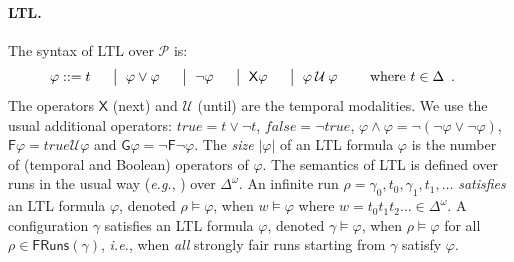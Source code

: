 \documentclass[10pt,a4paper]{article}
\newcommand{\size}[1]{|#1|}
\newcommand{\prot}{\mathcal{P}}
\newcommand{\fairrunsfrom}[1]{\mathsf{FRuns}(#1)}
\newcommand{\config}{\gamma}
\newcommand{\run}{\rho}
\newcommand{\transitions}{\Delta}
\newcommand*{\atrans}{t}
\newcommand{\DefOR}{\ensuremath{\hspace{0.6em}\big|\hspace{0.6em}}}
\newcommand{\ltlnext}{\mathsf{X}}
\newcommand{\ltlglobally}{\mathsf{G}}
\newcommand{\ltlfinally}{\mathsf{F}}
\newcommand{\ltluntil}{\mathbin \mathcal{U}}
\newcommand{\U}{\ltluntil}
\newcommand{\Next}{\ltlnext}
\newcommand{\modelsLTL}{\ensuremath{\models}}
\renewcommand{\And}{\mathrel{\wedge}}
\newcommand{\Or}{\mathrel{\vee}}
\newcommand{\true}{\mathit{true}}
\newcommand{\false}{\mathit{false}}
\begin{document}
\paragraph*{LTL.}
%
The syntax of LTL over \(\prot\) is:
\begin{alignat*}{6}
	                     & \varphi   ::=   \atrans &                                                                                  & \DefOR \varphi \lor \varphi &  & \DefOR \neg \varphi &  &
	\DefOR \Next \varphi &                         & \DefOR \varphi \U\varphi \qquad \text{ where } \atrans \in \transitions\enspace.
\end{alignat*}
%
The operators \(\Next\) (next) and \(\U\) (until) are the temporal modalities.
%
We use the usual additional operators: \(\true = t \Or \neg t\), \(\false =\neg\true\), \(\varphi\And\varphi = \neg(\neg\varphi\Or\neg\varphi)\), \(\ltlfinally\varphi= \true\U\varphi\) and \(\ltlglobally\varphi = \neg\ltlfinally\neg\varphi\).
The \emph{size} \(\size{\varphi}\) of an LTL formula \(\varphi\) is the number of (temporal and Boolean) operators of \(\varphi\).
The semantics of LTL is defined over runs in the usual way (\emph{e.g.}, \cite{BK08}) over \(\transitions^\omega\).
An infinite run \(\run = \config_0,\atrans_0, \config_1, \atrans_1,\dots\) \emph{satisfies} an LTL formula \(\varphi\), denoted \(\run \modelsLTL \varphi\), when \(w \modelsLTL \varphi\) where \(w = \atrans_0 \atrans_1 \atrans_2 \dots \in \transitions^\omega\).
A configuration \(\config\) satisfies an LTL formula \(\varphi\), denoted \(\config \modelsLTL \varphi\), when \(\run \modelsLTL \varphi\) for all \(\run \in \fairrunsfrom{\config}\), \emph{i.e.}, when \emph{all} strongly fair runs starting from \(\config\) satisfy \(\varphi\).
%
\end{document}
